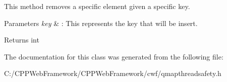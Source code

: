 This method removes a specific element given a specific key. 


\begin{DoxyParams}{Parameters}
{\em key} & \+: This represents the key that will be insert. \\
\hline
\end{DoxyParams}
\begin{DoxyReturn}{Returns}
int 
\end{DoxyReturn}


The documentation for this class was generated from the following file\+:\begin{DoxyCompactItemize}
\item 
C\+:/\+C\+P\+P\+Web\+Framework/\+C\+P\+P\+Web\+Framework/cwf/qmapthreadsafety.\+h\end{DoxyCompactItemize}
